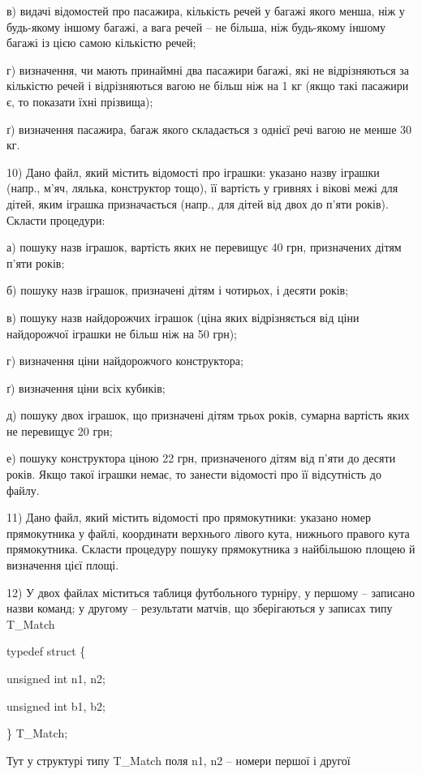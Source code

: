 \documentclass[]{article}
\begin{document}
в) видачі відомостей про пасажира, кількість речей у багажі якого менша,
ніж у будь-якому іншому багажі, а вага речей -- не більша, ніж
будь-якому іншому багажі із цією самою кількістю речей;

г) визначення, чи мають принаймні два пасажири багажі, які не
відрізняються за кількістю речей і відрізняються вагою не більш ніж на 1
кг (якщо такі пасажири є, то показати їхні прізвища);

ґ) визначення пасажира, багаж якого складається з однієї речі вагою не
менше 30 кг.

10) Дано файл, який містить відомості про іграшки: указано назву іграшки
(напр., м'яч, лялька, конструктор тощо), її вартість у гривнях і вікові
межі для дітей, яким іграшка призначається (напр., для дітей від двох до
п'яти років). Скласти процедури:

а) пошуку назв іграшок, вартість яких не перевищує 40 грн, призначених
дітям п'яти років;

б) пошуку назв іграшок, призначені дітям і чотирьох, і десяти років;

в) пошуку назв найдорожчих іграшок (ціна яких відрізняється від ціни
найдорожчої іграшки не більш ніж на 50 грн);

г) визначення ціни найдорожчого конструктора;

ґ) визначення ціни всіх кубиків;

д) пошуку двох іграшок, що призначені дітям трьох років, сумарна
вартість яких не перевищує 20 грн;

е) пошуку конструктора ціною 22 грн, призначеного дітям від п'яти до
десяти років. Якщо такої іграшки немає, то занести відомості про її
відсутність до файлу.

11) Дано файл, який містить відомості про прямокутники: указано номер
прямокутника у файлі, координати верхнього лівого кута, нижнього правого
кута прямокутника. Скласти процедуру пошуку прямокутника з найбільшою
площею й визначення цієї площі.

12) \protect\hypertarget{_Hlk65238015}{}{}У двох файлах міститься
таблиця футбольного турніру, у першому -- записано назви команд; у
другому -- результати матчів, що зберігаються у записах типу T\_Match

typedef struct \{

unsigned int n1, n2;

unsigned int b1, b2;

\} T\_Match;

Тут у структурі типу T\_Match поля n1, n2 -- номери першої і другої
\end{document}
